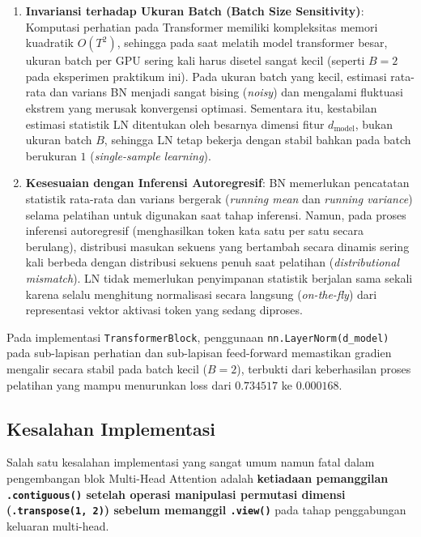 \documentclass[12pt,a4paper]{article}
\newcommand{\code}[1]{\texttt{\small #1}}
\begin{document}
\begin{enumerate}
    \item \textbf{Invariansi terhadap Ukuran Batch (Batch Size Sensitivity)}: Komputasi perhatian pada Transformer memiliki kompleksitas memori kuadratik $O(T^2)$, sehingga pada saat melatih model transformer besar, ukuran batch per GPU sering kali harus disetel sangat kecil (seperti $B=2$ pada eksperimen praktikum ini). Pada ukuran batch yang kecil, estimasi rata-rata dan varians BN menjadi sangat bising (\emph{noisy}) dan mengalami fluktuasi ekstrem yang merusak konvergensi optimasi. Sementara itu, kestabilan estimasi statistik LN ditentukan oleh besarnya dimensi fitur $d_{\text{model}}$, bukan ukuran batch $B$, sehingga LN tetap bekerja dengan stabil bahkan pada batch berukuran $1$ (\emph{single-sample learning}).

    \item \textbf{Kesesuaian dengan Inferensi Autoregresif}: BN memerlukan pencatatan statistik rata-rata dan varians bergerak (\emph{running mean} dan \emph{running variance}) selama pelatihan untuk digunakan saat tahap inferensi. Namun, pada proses inferensi autoregresif (menghasilkan token kata satu per satu secara berulang), distribusi masukan sekuens yang bertambah secara dinamis sering kali berbeda dengan distribusi sekuens penuh saat pelatihan (\emph{distributional mismatch}). LN tidak memerlukan penyimpanan statistik berjalan sama sekali karena selalu menghitung normalisasi secara langsung (\emph{on-the-fly}) dari representasi vektor aktivasi token yang sedang diproses.
\end{enumerate}
Pada implementasi \code{TransformerBlock}, penggunaan \texttt{nn.LayerNorm(d\_model)} pada sub-lapisan perhatian dan sub-lapisan feed-forward memastikan gradien mengalir secara stabil pada batch kecil ($B=2$), terbukti dari keberhasilan proses pelatihan yang mampu menurunkan loss dari $0.734517$ ke $0.000168$.

\subsection{Kesalahan Implementasi}
Salah satu kesalahan implementasi yang sangat umum namun fatal dalam pengembangan blok Multi-Head Attention adalah \textbf{ketiadaan pemanggilan \texttt{.contiguous()} setelah operasi manipulasi permutasi dimensi (\texttt{.transpose(1, 2)}) sebelum memanggil \texttt{.view()}} pada tahap penggabungan keluaran multi-head.
\end{document}
